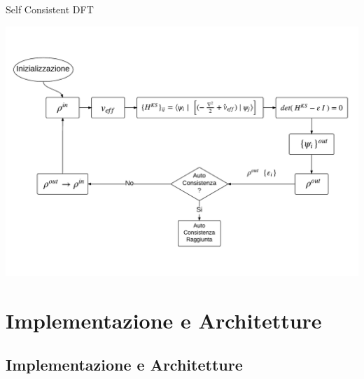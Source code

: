 \documentclass[8pt]{beamer}
\begin{document}
\begin{frame}{Self Consistent DFT}
\begin{center}
	\includegraphics[width=\textwidth]{beam_SCF_0.pdf}	
\end{center}
\end{frame}

\section{Implementazione e Architetture}
\subsection{Implementazione e Architetture}


\def \inputPos {3}
\def \electronsPos {4}
\def \cegtergPos {5}
\def \hpsiPos {6}
\def \cdiaghgPos {7}
\def \sumbandPos {8}
\def \fftPos {9}
\def \fftscatterPos {10}
\def \scfPicWidth {1.1}
\def \scfPicHeight {0.62}
\end{document}
